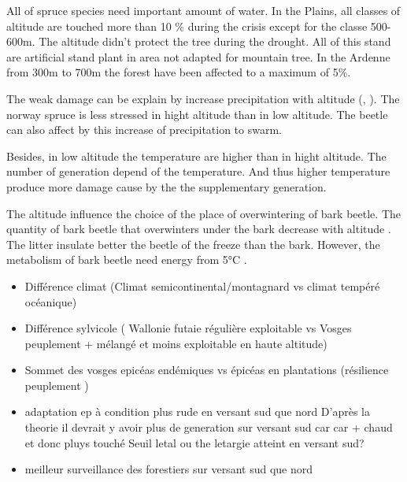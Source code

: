 \documentclass[3p,procedia]{elsarticle}
\begin{document}
 






All of spruce species need important amount of water. 
In the Plains, all classes of altitude are touched more than 10 \% during the crisis except for the classe 500-600m. 
The altitude didn't protect the tree during the drought. 
All of this stand are artificial stand plant in area not adapted for mountain tree. In the Ardenne from 300m to 700m the forest have been affected to a maximum of 5\%. 

The weak damage can be explain by increase precipitation with altitude (\cite{kotlarski_elevation_2012}, \cite{Roe_orographic_preicpitation_2005}).
The norway spruce is less stressed in hight altitude than in low altitude. 
The beetle can also affect by this increase of precipitation to swarm. 

Besides, in low altitude the temperature are higher than in hight altitude. 
The number of generation depend of the temperature.
And thus higher temperature produce more damage cause by the the supplementary generation. 

The altitude influence the choice of the place of overwintering of  bark beetle.
The quantity of bark beetle that overwinters under the bark decrease with altitude \citep{kasumovic_overwintering_2019}.
The litter insulate better the beetle of the freeze \citep{lombardero_cold_2000} than the bark.
However, the metabolism of bark beetle need energy from 5°C  \citep{kostal_physiological_2011}.





\begin{itemize}
	\item Différence climat (Climat semicontinental/montagnard vs climat tempéré océanique)
	\item Différence sylvicole ( Wallonie futaie régulière exploitable vs Vosges peuplement + mélangé et moins exploitable en haute altitude)
	\item Sommet des vosges epicéas endémiques vs épicéas en plantations (résilience peuplement )
	\item adaptation ep à condition plus rude en versant sud que nord 
	D'après la theorie il devrait y avoir plus de generation sur versant sud car car + chaud et donc pluys touché
	Seuil letal ou the letargie atteint en versant sud?
\item meilleur surveillance des forestiers sur versant sud que nord 
	
\end{itemize}
\end{document}
